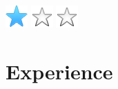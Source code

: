 \documentclass[]{cv-class}
\begin{document}
\begin{aside}
{    \includegraphics[scale=0.30]{img/star.png}
    \includegraphics[scale=0.30]{img/star_empty.png}
    \includegraphics[scale=0.30]{img/star_empty.png}}
    
\end{aside}

\vspace{0.75cm}
\section{Experience}
\end{document}
